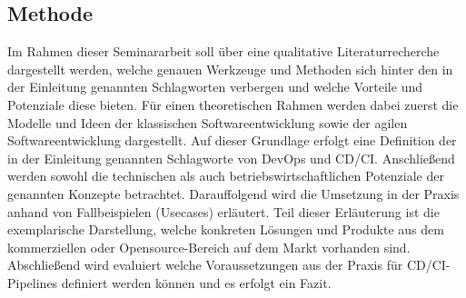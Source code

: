 \subsection{Methode}
\label{Methode}
Im Rahmen dieser Seminararbeit soll über eine qualitative Literaturrecherche dargestellt werden, welche genauen Werkzeuge und Methoden sich hinter den in der Einleitung genannten Schlagworten verbergen und welche Vorteile und Potenziale diese bieten.
Für einen theoretischen Rahmen werden dabei zuerst die Modelle und Ideen der klassischen Softwareentwicklung sowie der agilen Softwareentwicklung dargestellt. Auf dieser Grundlage erfolgt eine Definition der in der Einleitung genannten Schlagworte von \gls{DevOps} und \acrshort{CD}/\acrshort{CI}.
Anschließend werden sowohl die technischen als auch betriebswirtschaftlichen Potenziale der genannten Konzepte betrachtet. Darauffolgend wird die Umsetzung in der Praxis anhand von Fallbeispielen (Usecases) erläutert. Teil dieser Erläuterung ist die exemplarische Darstellung, welche konkreten Lösungen und Produkte aus dem kommerziellen oder Opensource-Bereich  auf dem Markt vorhanden sind.
Abschließend wird evaluiert welche Voraussetzungen aus der Praxis  für \acrshort{CD}/\acrshort{CI}-Pipelines definiert werden können und es erfolgt ein Fazit.